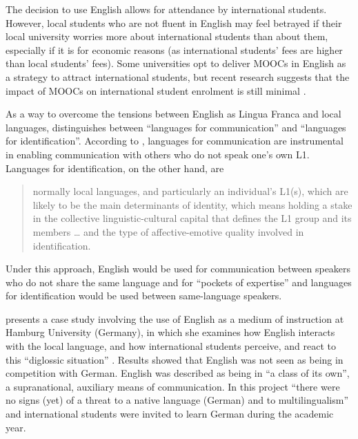 \documentclass[output=paper]{langscibook}
\begin{document}
The decision to use English allows for attendance by international students. However, local students who are not fluent in English may feel betrayed if their local university worries more about international students than about them, especially if it is for economic reasons (as international students’ fees are higher than local students’ fees). Some universities opt to deliver MOOCs in English as a strategy to attract international students, but recent research suggests that the impact of MOOCs on international student enrolment is still minimal \citep{Zakharova2019}.

As a way to overcome the tensions between English as Lingua Franca and local languages, \citet{House2003} distinguishes between “languages for communication” and “languages for identification”. According to \citet[560]{House2003}, languages for communication are instrumental in enabling communication with others who do not speak one’s own L1. Languages for identification, on the other hand, are

\begin{quote}
 {normally local languages, and particularly an individual’s L1(s), which are likely to be the main determinants of identity, which means holding a stake in the collective linguistic-cultural capital that defines the L1 group and its members …  and the type of affective-emotive quality involved in identification. \citep[561]{House2003}}
\end{quote}

\begin{sloppypar}
Under this approach, English would be used for communication between speakers who do not share the same language and for “pockets of expertise” \citep[561]{House2003} and languages for identification would be used between same-language speakers. 
\end{sloppypar}

\citet{House2003} presents a case study involving the use of English as a medium of instruction at Hamburg University (Germany), in which she examines how English interacts with the local language, and how international students perceive, and react to this “diglossic situation” \citep[570]{House2003}. Results showed that English was not seen as being in competition with German. English was described as being in “a class of its own”, a supranational, auxiliary means of communication. In this project “there were no signs (yet) of a threat to a native language (German) and to multilingualism” \citep[574]{House2003} and international students were invited to learn German during the academic year.
\end{document}
